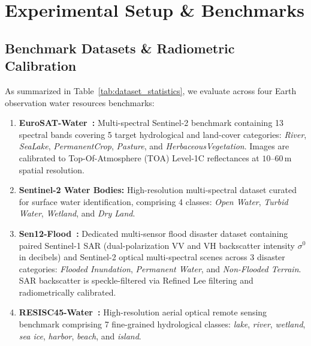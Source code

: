 \section{Experimental Setup \& Benchmarks}
\label{sec:setup}

\subsection{Benchmark Datasets \& Radiometric Calibration}
As summarized in Table~\ref{tab:dataset_statistics}, we evaluate \rllctim{} across four Earth observation water resources benchmarks:

\begin{enumerate}
    \item \textbf{EuroSAT-Water~\cite{helber2018eurosat}:} Multi-spectral Sentinel-2 benchmark containing 13 spectral bands covering 5 target hydrological and land-cover categories: \emph{River}, \emph{SeaLake}, \emph{PermanentCrop}, \emph{Pasture}, and \emph{HerbaceousVegetation}. Images are calibrated to Top-Of-Atmosphere (TOA) Level-1C reflectances at $10\text{--}60$\,m spatial resolution.
    \item \textbf{Sentinel-2 Water Bodies:} High-resolution multi-spectral dataset curated for surface water identification, comprising 4 classes: \emph{Open Water}, \emph{Turbid Water}, \emph{Wetland}, and \emph{Dry Land}.
    \item \textbf{Sen12-Flood~\cite{boudjit2021sen12flood}:} Dedicated multi-sensor flood disaster dataset containing paired Sentinel-1 SAR (dual-polarization VV and VH backscatter intensity $\sigma^0$ in decibels) and Sentinel-2 optical multi-spectral scenes across 3 disaster categories: \emph{Flooded Inundation}, \emph{Permanent Water}, and \emph{Non-Flooded Terrain}. SAR backscatter is speckle-filtered via Refined Lee filtering and radiometrically calibrated.
    \item \textbf{RESISC45-Water~\cite{cheng2017resisc45}:} High-resolution aerial optical remote sensing benchmark comprising 7 fine-grained hydrological classes: \emph{lake}, \emph{river}, \emph{wetland}, \emph{sea ice}, \emph{harbor}, \emph{beach}, and \emph{island}.
\end{enumerate}

